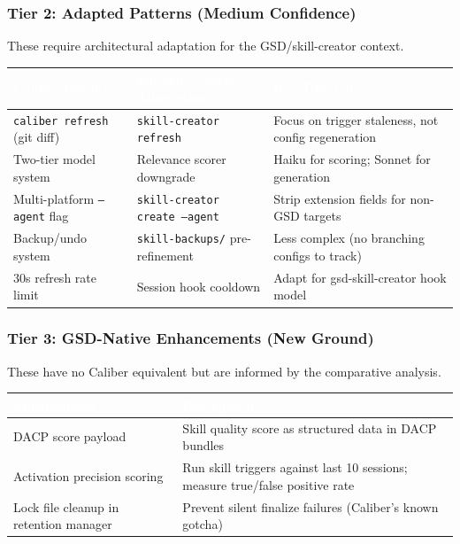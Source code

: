 \documentclass[11pt,letterpaper]{article}
\newcommand{\tableheader}[1]{\textbf{\sffamily\textcolor{white}{#1}}}
\begin{document}
\subsubsection{Tier 2: Adapted Patterns (Medium Confidence)}

These require architectural adaptation for the GSD/skill-creator context.

\begin{center}
\begin{tabularx}{\textwidth}{L{3cm}L{3.5cm}X}
\toprule
{}
\tableheader{Caliber Feature} & \tableheader{gsd-skill-creator Adaptation} & \tableheader{Key Difference} \\
\midrule
\texttt{caliber refresh} (git diff) & \texttt{skill-creator refresh} & Focus on trigger staleness, not config regeneration \\
Two-tier model system & Relevance scorer downgrade & Haiku for scoring; Sonnet for generation \\
Multi-platform \texttt{--agent} flag & \texttt{skill-creator create --agent} & Strip extension fields for non-GSD targets \\
Backup/undo system & \texttt{skill-backups/} pre-refinement & Less complex (no branching configs to track) \\
30s refresh rate limit & Session hook cooldown & Adapt for gsd-skill-creator hook model \\
\bottomrule
\end{tabularx}
\end{center}

\subsubsection{Tier 3: GSD-Native Enhancements (New Ground)}

These have no Caliber equivalent but are informed by the comparative analysis.

\begin{center}
\begin{tabularx}{\textwidth}{L{4cm}X}
\toprule
{}
\tableheader{Enhancement} & \tableheader{Description} \\
\midrule
DACP score payload & Skill quality score as structured data in DACP bundles \\
Activation precision scoring & Run skill triggers against last 10 sessions; measure true/false positive rate \\
Lock file cleanup in retention manager & Prevent silent finalize failures (Caliber's known gotcha) \\
\bottomrule
\end{tabularx}
\end{center}
\end{document}
